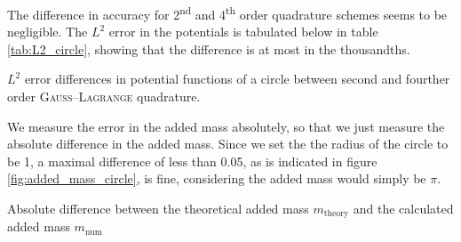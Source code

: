 \noindent
The difference in accuracy for 2\textsuperscript{nd} and 4\textsuperscript{th} order quadrature schemes seems to be negligible.
The $L^2$ error in the potentials is tabulated below in table \ref{tab:L2_circle}, showing that the difference is at most in the thousandths.
\begin{Figure}
  \centering
  \captionsetup{type = table}
  \caption{$L^2$ error differences in potential functions of a circle between second and fourther order \textsc{Gauss}--\textsc{Lagrange} quadrature.}
  \label{tab:L2_circle}
\end{Figure}

\noindent
We measure the error in the added mass absolutely, so that we just measure the absolute difference in the added mass.
Since we set the the radius of the circle to be 1, a maximal difference of less than 0.05, as is indicated in figure \ref{fig:added_mass_circle}, is fine, considering the added mass would simply be $\pi$.
\begin{Figure}
  \centering
  \resizebox{\textwidth}{!}{}
  \captionsetup{type = figure}
  \caption{Absolute difference between the theoretical added mass $m_{\mathrm{theory}}$ and the calculated added mass $m_{\mathrm{num}}$}
  \label{fig:added_mass_circle}
\end{Figure}
